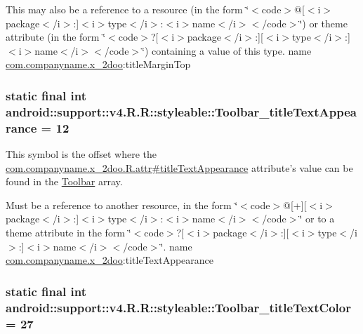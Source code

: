 This may also be a reference to a resource (in the form \char`\"{}$<$code$>$@\mbox{[}$<$i$>$package$<$/i$>$:\mbox{]}$<$i$>$type$<$/i$>$:$<$i$>$name$<$/i$>$$<$/code$>$\char`\"{}) or theme attribute (in the form \char`\"{}$<$code$>$?\mbox{[}$<$i$>$package$<$/i$>$:\mbox{]}\mbox{[}$<$i$>$type$<$/i$>$:\mbox{]}$<$i$>$name$<$/i$>$$<$/code$>$\char`\"{}) containing a value of this type.  name \hyperlink{namespacecom_1_1companyname_1_1x__2doo}{com.companyname.x\_\-2doo}:titleMarginTop \hypertarget{classandroid_1_1support_1_1v4_1_1_r_1_1styleable_bced41bbc6326ea8b574802f6d167432}{
\subsubsection[{Toolbar\_\-titleTextAppearance}]{\setlength{\rightskip}{0pt plus 5cm}static final int android::support::v4.R.R::styleable::Toolbar\_\-titleTextAppearance = 12}}
\label{classandroid_1_1support_1_1v4_1_1_r_1_1styleable_bced41bbc6326ea8b574802f6d167432}


This symbol is the offset where the \hyperlink{classcom_1_1companyname_1_1x__2doo_1_1_r_1_1attr_1dfbda9d281812236b99a626c5cad5f2}{com.companyname.x\_\-2doo.R.attr\#titleTextAppearance} attribute's value can be found in the \hyperlink{classandroid_1_1support_1_1v4_1_1_r_1_1styleable_0646d71cfbd4a8645c7d805b33e1c574}{Toolbar} array.

Must be a reference to another resource, in the form \char`\"{}$<$code$>$@\mbox{[}+\mbox{]}\mbox{[}$<$i$>$package$<$/i$>$:\mbox{]}$<$i$>$type$<$/i$>$:$<$i$>$name$<$/i$>$$<$/code$>$\char`\"{} or to a theme attribute in the form \char`\"{}$<$code$>$?\mbox{[}$<$i$>$package$<$/i$>$:\mbox{]}\mbox{[}$<$i$>$type$<$/i$>$:\mbox{]}$<$i$>$name$<$/i$>$$<$/code$>$\char`\"{}.  name \hyperlink{namespacecom_1_1companyname_1_1x__2doo}{com.companyname.x\_\-2doo}:titleTextAppearance \hypertarget{classandroid_1_1support_1_1v4_1_1_r_1_1styleable_16f85315e8a126339f05a6869996771b}{
\subsubsection[{Toolbar\_\-titleTextColor}]{\setlength{\rightskip}{0pt plus 5cm}static final int android::support::v4.R.R::styleable::Toolbar\_\-titleTextColor = 27}}
\label{classandroid_1_1support_1_1v4_1_1_r_1_1styleable_16f85315e8a126339f05a6869996771b}


